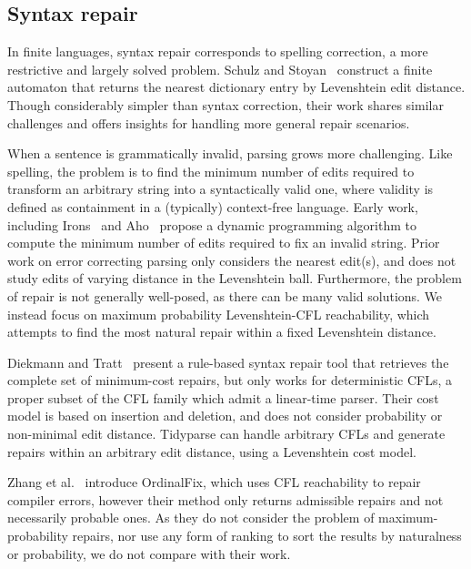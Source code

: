 \documentclass[sigplan,review,acmsmall,nonacm,screen,anonymous]{acmart}\settopmatter{printfolios=false,printccs=false,printacmref=false}
\begin{document}
\subsection{Syntax repair}

In finite languages, syntax repair corresponds to spelling correction, a more restrictive and largely solved problem. Schulz and Stoyan~\cite{schulz2002fast} construct a finite automaton that returns the nearest dictionary entry by Levenshtein edit distance. Though considerably simpler than syntax correction, their work shares similar challenges and offers insights for handling more general repair scenarios.

When a sentence is grammatically invalid, parsing grows more challenging. Like spelling, the problem is to find the minimum number of edits required to transform an arbitrary string into a syntactically valid one, where validity is defined as containment in a (typically) context-free language. Early work, including Irons~\cite{irons1963error} and Aho~\cite{aho1972minimum} propose a dynamic programming algorithm to compute the minimum number of edits required to fix an invalid string. Prior work on error correcting parsing only considers the nearest edit(s), and does not study edits of varying distance in the Levenshtein ball. Furthermore, the problem of repair is not generally well-posed, as there can be many valid solutions. We instead focus on maximum probability Levenshtein-CFL reachability, which attempts to find the most natural repair within a fixed Levenshtein distance.

Diekmann and Tratt~\cite{diekmann2018dont} present a rule-based syntax repair tool that retrieves the complete set of minimum-cost repairs, but only works for deterministic CFLs, a proper subset of the CFL family which admit a linear-time parser. Their cost model is based on insertion and deletion, and does not consider probability or non-minimal edit distance. Tidyparse can handle arbitrary CFLs and generate repairs within an arbitrary edit distance, using a Levenshtein cost model.

Zhang et al.~\cite{zhang2023ordinalfix} introduce OrdinalFix, which uses CFL reachability to repair compiler errors, however their method only returns admissible repairs and not necessarily probable ones. As they do not consider the problem of maximum-probability repairs, nor use any form of ranking to sort the results by naturalness or probability, we do not compare with their work.
\end{document}
